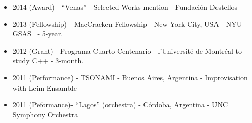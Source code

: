\begin{itemize}
\item 2014 (Award) - ``Venas'' - Selected Works mention - Fundación Destellos 
\item 2013 (Fellowship) - MacCracken Fellowship - New York City, USA - NYU GSAS  - 5-year.
\item 2012 (Grant) - Programa Cuarto Centenario - l'Université de Montréal to study C++ - 3-month.
\item 2011 (Performance) - TSONAMI - Buenos Aires, Argentina - Improvisation with Leim Ensamble
\item 2011 (Peformance)- ``Lagos'' (orchestra) - Córdoba, Argentina - UNC Symphony Orchestra
\end{itemize}
